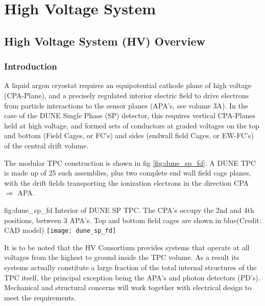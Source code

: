 \chapter{High Voltage System}
\label{ch:fdsp-hv}

\section{High Voltage System (HV) Overview}
\label{sec:fdsp-hv-ov}


\subsection{Introduction}
\label{sec:fdsp-hv-intro}
A liquid argon cryostat requires an equipotential cathode plane of high voltage (CPA-Plane), and a precisely regulated interior electric field to drive electrons from particle interactions to the sensor planes (APA's, see volume 3A). In the case of the DUNE Single Phase (SP) detector, this requires vertical CPA-Planes held at high voltage, and formed sets of conductors at graded voltages on the top and bottom (Field Cages, or FC's) and sides (endwall field Cages, or EW-FC's) of the central drift volume.

The modular TPC construction is shown in fig \ref{fig:dune_sp_fd}. A DUNE TPC is made up of 25 such assemblies, plus two complete end wall field cage planes, with the  drift fields transporting the ionization electrons in the direction CPA $\Rightarrow$ APA. 

\begin{dunefigure}{fig:dune_sp_fd}
{Interior of DUNE SP TPC. The CPA's occupy the 2nd and 4th positions, between 3 APA's. Top and bottom field cages are shown in blue(Credit: CAD model)}
\texttt{[image: dune\_sp\_fd]}
\end{dunefigure}

It is to be noted that the HV Consortium provides systems that operate at all voltages from the highest to ground inside the TPC volume. As a result its systems actually constitute a large fraction of the total internal structures of the TPC itself, the principal exception being the APA's and photon detectors (PD's). Mechanical and structural concerns will work together with electrical design to meet the requirements.


